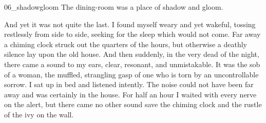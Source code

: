 \begin{a4}
\begin{bwbigpic}
		[1.0]  
	{06_shadowgloom}
	{The dining-room was a place of shadow and gloom.}
\end{bwbigpic}
\end{a4}

And yet it was not quite the last. I found myself weary and yet wakeful, tossing restlessly from side to side, seeking for the sleep which would not come. Far away a chiming clock struck out the quarters of the hours, but otherwise a deathly silence lay upon the old house. And then suddenly, in the very dead of the night, there came a sound to my ears, clear, resonant, and unmistakable. It was the sob of a woman, the muffled, strangling gasp of one who is torn by an uncontrollable sorrow. I sat up in bed and listened intently. The noise could not have been far away and was certainly in the house. For half an hour I waited with every nerve on the alert, but there came no other sound save the chiming clock and the rustle of the ivy on the wall.


